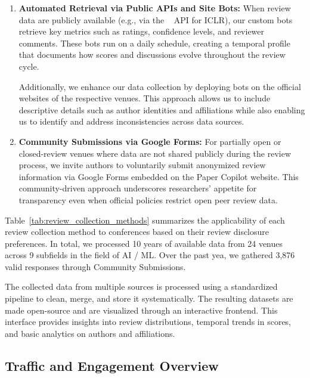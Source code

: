 \begin{enumerate}
    \item \textbf{Automated Retrieval via Public APIs and Site Bots:} 
    When review data are publicly available (e.g., via the ~\citet{openreview_api} API for ICLR), our custom bots retrieve key metrics such as ratings, confidence levels, and reviewer comments. These bots run on a daily schedule, creating a temporal profile that documents how scores and discussions evolve throughout the review cycle.

    Additionally, we enhance our data collection by deploying bots on the official websites of the respective venues. This approach allows us to include descriptive details such as author identities and affiliations while also enabling us to identify and address inconsistencies across data sources.

    \item \textbf{Community Submissions via Google Forms:} 
    For partially open or closed-review venues where data are not shared publicly during the review process, we invite authors to voluntarily submit anonymized review information via Google Forms embedded on the Paper Copilot website. This community-driven approach underscores researchers’ appetite for transparency even when official policies restrict open peer review data.

\end{enumerate}

Table~\ref{tab:review_collection_methods} summarizes the applicability of each review collection method to conferences based on their review disclosure preferences. In total, we processed 10 years of available data from 24 venues across 9 subfields in the field of AI / ML. Over the past yea, we gathered 3,876 valid responses through Community Submissions.


The collected data from multiple sources is processed using a standardized pipeline to clean, merge, and store it systematically. The resulting datasets are made open-source and are visualized through an interactive frontend. This interface provides insights into review distributions, temporal trends in scores, and basic analytics on authors and affiliations.

\subsection{Traffic and Engagement Overview}



